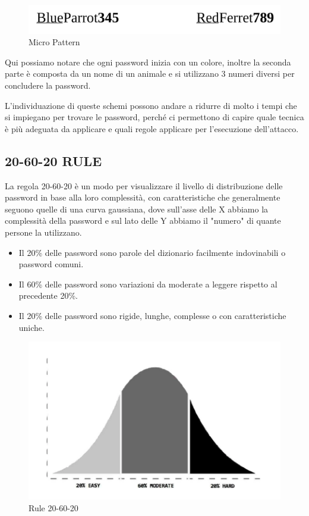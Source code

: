 \begin{itemize}
          \begin{figure}[h]
              \centering
              \includegraphics[width=\linewidth]{Immagini/introduzione/Micro_Pattern.png}
              \caption{Micro Pattern}
              \label{fig:micro}
          \end{figure}
          \newline Qui possiamo notare che ogni password inizia con un colore, inoltre la seconda parte è composta da un nome di un animale e si utilizzano 3 numeri diversi per concludere la password.
\end{itemize}

L'individuazione di queste schemi possono andare a ridurre di molto i tempi che si impiegano per trovare le password, perché ci permettono di capire quale tecnica è più adeguata da applicare e quali regole applicare per l’esecuzione dell’attacco.

\subsection{20-60-20 RULE}

La regola 20-60-20 è un modo per visualizzare il livello di distribuzione delle password in base alla loro complessità, con caratteristiche che generalmente seguono quelle di una curva gaussiana, dove sull'asse delle X abbiamo la complessità della password e sul lato delle Y abbiamo il "numero" di quante persone la utilizzano.
\begin{itemize}
    \item Il 20\% delle password sono parole del dizionario facilmente indovinabili o password comuni.
    \item Il 60\% delle password sono variazioni da moderate a leggere rispetto al precedente 20\%.
    \item Il 20\% delle password sono rigide, lunghe, complesse o con caratteristiche uniche.
\end{itemize}

\begin{figure}[htpb!]
    \centering
    \includegraphics[width=\linewidth]{Immagini/introduzione/20-60-20.png}
    \caption{Rule 20-60-20 \cite{hashcrack}}
    \label{fig:rocker}
\end{figure}


